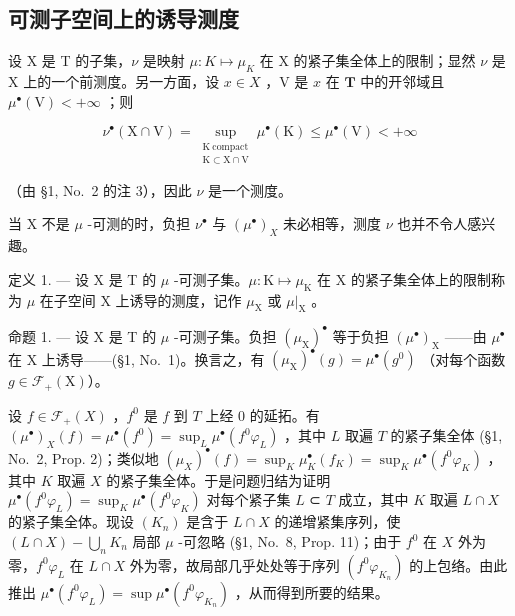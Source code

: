 \subsection{可测子空间上的诱导测度}

设 X 是 T 的子集，\(\nu\) 是映射 \(\mu: K \mapsto \mu_{K}\) 在 X 的紧子集全体上的限制；显然 \(\nu\) 是 X 上的一个前测度。另一方面，设 \(x \in X\) ，V 是 \(x\) 在 \(\mathbf{T}\) 中的开邻域且 \(\mu^{\bullet}(\mathrm{V}) < +\infty\) ；则

\[
\nu^{\bullet}(\mathrm{X}\cap \mathrm{V}) = \sup_{\substack{\mathrm{K\ compact}\\ \mathrm{K}\subset \mathrm{X}\cap \mathrm{V}}}\mu^{\bullet}(\mathrm{K})\leqslant \mu^{\bullet}(\mathrm{V}) <   + \infty
\]

（由 §1, No.~2 的注 3），因此 \(\nu\) 是一个测度。

当 X 不是 \(\mu\) -可测的时，负担 \(\nu^{\bullet}\) 与 \((\mu^{\bullet})_{X}\) 未必相等，测度 \(\nu\) 也并不令人感兴趣。

定义 1. --- 设 X 是 T 的 \(\mu\) -可测子集。\(\mu: \mathrm{K} \mapsto \mu_{\mathrm{K}}\) 在 X 的紧子集全体上的限制称为 \(\mu\) 在子空间 X 上诱导的测度，记作 \(\mu_{\mathrm{X}}\) 或 \(\mu|_{\mathrm{X}}\) 。

命题 1. --- 设 X 是 T 的 \(\mu\) -可测子集。负担 \((\mu_{\mathrm{X}})^{\bullet}\) 等于负担 \((\mu^{\bullet})_{\mathrm{X}}\) ——由 \(\mu^{\bullet}\) 在 X 上诱导——(§1, No.~1)。换言之，有 \((\mu_{\mathrm{X}})^{\bullet}(g) = \mu^{\bullet}(g^{0})\) （对每个函数 \(g \in \mathcal{F}_{+}(\mathrm{X})\)）。

设 \(f \in \mathcal{F}_{+}(X)\) ，\(f^{0}\) 是 \(f\) 到 \(T\) 上经 0 的延拓。有 \((\mu^{\bullet})_{X}(f) = \mu^{\bullet}(f^{0}) = \sup_{L} \mu^{\bullet}(f^{0}\varphi_{L})\) ，其中 \(L\) 取遍 \(T\) 的紧子集全体 (§1, No.~2, Prop. 2)；类似地 \((\mu_{X})^{\bullet}(f) = \sup_{K} \mu_{K}^{\bullet}(f_{K}) = \sup_{K} \mu^{\bullet}(f^{0}\varphi_{K})\) ，其中 \(K\) 取遍 \(X\) 的紧子集全体。于是问题归结为证明 \(\mu^{\bullet}(f^{0}\varphi_{L}) = \sup_{K} \mu^{\bullet}(f^{0}\varphi_{K})\) 对每个紧子集 \(L\) ⊂ \(T\) 成立，其中 \(K\) 取遍 \(L \cap X\) 的紧子集全体。现设 \((K_{n})\) 是含于 \(L \cap X\) 的递增紧集序列，使 \((L \cap X) - \bigcup_{n} K_{n}\) 局部 \(\mu\) -可忽略 (§1, No.~8, Prop. 11)；由于 \(f^{0}\) 在 \(X\) 外为零，\(f^{0}\varphi_{L}\) 在 \(L \cap X\) 外为零，故局部几乎处处等于序列 \((f^{0}\varphi_{K_{n}})\) 的上包络。由此推出 \(\mu^{\bullet}(f^{0}\varphi_{L}) = \sup \mu^{\bullet}(f^{0}\varphi_{K_{n}})\) ，从而得到所要的结果。

